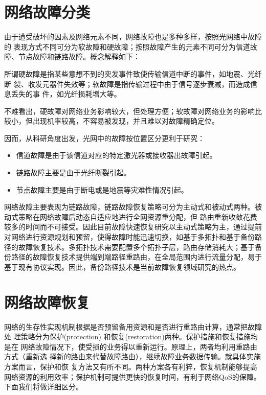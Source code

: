 \section{网络故障分类}
由于遭受破坏的因素及网络元素不同，网络故障也是多种多样，按照光网络中故障的 表现方式不同可分为软故障和硬故障；按照故障产生的元素不同可分为信道故障、节点故障和链路故障。概念解释如下：

所谓硬故障是指某些意想不到的突发事件致使传输信道中断的事件，如地震、光纤断 裂、收发元器件失效等；软故障是指传输过程中由于信号逐步衰减，而造成信息丢失的事 件，如光纤损耗増大等。

不难看出，硬故障对网络业务影响较大，但处理方便；软故障对网络业务的影响比较小，但出现机率较高，不容易被发现，并且难以对故障精确定位。

因而，从科研角度出发，光网中的故障按位置区分更利于研究：
\begin{itemize}
\item 信道故障是由于该信道对应的特定激光器或接收器出故障引起。
\item 链路故障主要是由于光纤断裂引起。
\item 节点故障主要是由于断电或是地震等灾难性情况引起。
\end{itemize}

网络故障主要表现为链路故障，链路故障恢复策略可分为主动式和被动式两种\cite{kvalbein2009multiple}。被动式策略在网络故障后动态自适应地进行全网资源重分配，但
路由重新收敛花费较多的时间而不可接受。因此目前故障快速恢复研究以主动式策略为主，通过提前对网络进行资源规划和预留，使得故障时能迅速切换，如基于多拓扑\cite{shand2010ip}和基于备份路径的故障恢复技术。多拓扑技术需要配置多个拓扑子层，路由存储消耗大；基于备份路径的故障恢复技术提供端到端路径重路由，在全局范围内进行流量分配，易于基于现有协议实现。因此，备份路径技术是当前故障恢复领域研究的热点\cite{yang2014keep,suchara2011network,banner2010designing}。

\section{网络故障恢复}
网络的生存性实现机制根据是否预留备用资源和是否进行重路由计算，通常把故障处 理策略分为保护(protection) 和恢复(restoration)两种。保护措施和恢复措施均是在 网络故障情况下，使受损的业务得以重新运行。原理上，两者均利用重路由方式（重新选 择新的路由来代替故障路由），继续故障业务数据传输。就具体实施方案而言，保护和恢 复方法又有所不同。两种方案各有利猝，恢复机制能够提高网络资源的利用效率；保护机制可提供更快的恢复时间，有利于网络QoS的保障。下面我们将做详细区分。

